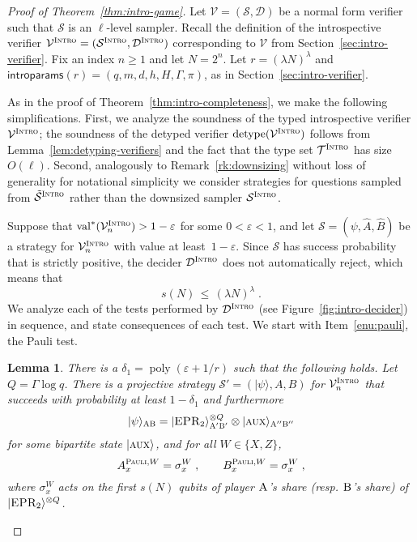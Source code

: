 \documentclass[11pt]{article}
\newtheorem{lemma}[theorem]{Lemma}
\theoremstyle{definition}
\newcommand{\ket}[1]{|#1\rangle}
\DeclareMathOperator{\poly}{poly}
\newcommand{\val}{\ensuremath{\mathrm{val}}}
\newcommand{\eps}{\varepsilon}
\newcommand{\sampler}{\mathcal{S}}
\newcommand{\decider}{\mathcal{D}}
\newcommand{\verifier}{\mathcal{V}}
\newcommand{\strategy}{\mathscr{S}}
\newcommand{\detype}{\mathrm{detype}}
\newcommand{\type}{\mathcal{T}}
\newcommand{\gamestyle}[1]{\ensuremath{\textsc{#1}}\xspace}
\newcommand{\intro}{\gamestyle{Intro}}
\newcommand{\labelstyle}[1]{\ensuremath{\textsc{#1}}\xspace}
\newcommand{\EPR}{\labelstyle{EPR}}
\newcommand{\aux}{\labelstyle{aux}}
\newcommand{\alice}{\labelstyle{A}}
\newcommand{\bob}{\labelstyle{B}}
\newcommand{\typestyle}[1]{\ensuremath{\textsc{#1}}\xspace}
\newcommand{\Pauli}{\typestyle{Pauli}}
\newcommand{\introparams}{\mathsf{introparams}}
\begin{document}
\begin{proof}[Proof of Theorem~\ref{thm:intro-game}]
  Let $\verifier=(\sampler, \decider)$ be a normal form verifier such that
  $\sampler$ is an $\ell$-level sampler.
  Recall the definition of the introspective verifier $\verifier^\intro =
  (\sampler^\intro, \decider^\intro)$ corresponding to $\verifier$ from
  Section~\ref{sec:intro-verifier}.
  Fix an index $n\geq 1$ and let $N = 2^n$.
  Let $r = (\lambda N)^\lambda$ and $\introparams(r) = (q,m,d,h,H,\Gamma,\pi)$,
  as in Section~\ref{sec:intro-verifier}.
 
  As in the proof of Theorem~\ref{thm:intro-completeness}, we make the following
  simplifications.
  First, we analyze the soundness of the typed introspective verifier
  $\verifier^\intro$; the soundness of the detyped verifier
  $\detype(\verifier^\intro)$ follows from Lemma~\ref{lem:detyping-verifiers}
  and the fact that the type set $\type^\intro$ has size $O(\ell)$.
  Second, analogously to Remark~\ref{rk:downsizing} without loss of generality
  for notational simplicity we consider strategies for questions sampled from
  $\tilde{\sampler}^\intro$ rather than the downsized sampler
  ${\sampler}^\intro$.

  Suppose that $\val^*(\verifier_n^\intro) > 1-\eps$ for some $0 < \eps < 1$,
  and let $\strategy = (\psi, \hat{A}, \hat{B})$ be a strategy for
  $\verifier^\intro_n$ with value at least~$1-\eps$.
  Since $\strategy$ has success probability that is strictly positive, the
  decider $\decider^\intro$ does not automatically reject, which means that
	\begin{equation}\label{eq:intro-sound-lambda}
	s(N) \,\leq\, (\lambda N)^\lambda\;.
	\end{equation}
	We analyze each of the tests performed by $\decider^\intro$ (see
  Figure~\ref{fig:intro-decider}) in sequence, and state consequences of each
  test.
  We start with Item~\ref{enu:pauli}, the Pauli test.
	
  \begin{lemma}\label{lem:intro-pauli-strat}
    There is a $\delta_1 = \poly(\eps+1/r)$ such that the following holds.
    Let $Q = \Gamma \log q$.
    There is a projective strategy $\strategy'=(\ket{\psi},A,B)$ for
    $\verifier^\intro_n$ that succeeds with probability at least $1-\delta_1$
    and furthermore
    \begin{equation}
      \label{eq:intro-state-a}
      \ket{\psi}_{\alice\bob} =  \ket{\EPR_2}_{\alice'\bob'}^{\otimes Q} \otimes
      \ket{\aux}_{\alice''\bob''}
    \end{equation}
    for some  bipartite state $\ket{\aux}$, and for all $W\in\{X,Z\}$,
    \begin{equation}\label{eq:intro-sound-paulia}
      A^{\Pauli,W}_x = \sigma^W_x \;,\qquad B^{\Pauli,W}_x = \sigma^W_x \;,
    \end{equation}
    where $\sigma^W_x$ acts on the first $s(N)$ qubits of player $\alice$'s
    share (resp.
    $\bob$'s share) of $\ket{\EPR_2}^{\otimes Q}$.
  \end{lemma}
	

\end{proof}
\end{document}
